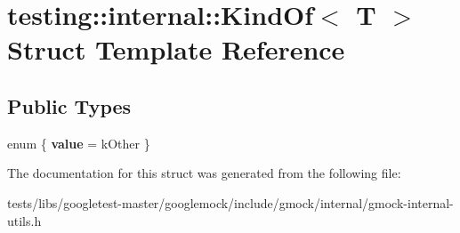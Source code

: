 \hypertarget{structtesting_1_1internal_1_1KindOf}{}\section{testing\+:\+:internal\+:\+:Kind\+Of$<$ T $>$ Struct Template Reference}
\label{structtesting_1_1internal_1_1KindOf}
\subsection*{Public Types}
\begin{DoxyCompactItemize}
\item 
\mbox{\label{structtesting_1_1internal_1_1KindOf_a4866389a4bc8d5522b5f8ae61a42f520}} 
enum \{ {\bfseries value} = k\+Other
 \}
\end{DoxyCompactItemize}


The documentation for this struct was generated from the following file\+:\begin{DoxyCompactItemize}
\item 
tests/libs/googletest-\/master/googlemock/include/gmock/internal/gmock-\/internal-\/utils.\+h\end{DoxyCompactItemize}
